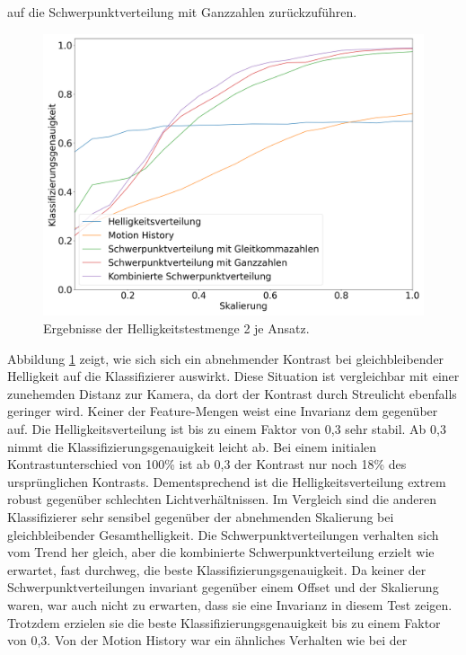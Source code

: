 auf die Schwerpunktverteilung mit Ganzzahlen zurückzuführen.
\begin{figure}[h!]
    \centering
    \includegraphics[width=\linewidth]{images/brightness2_scaling.png}
    \caption{Ergebnisse der Helligkeitstestmenge 2 je Ansatz.}
    \label{fig:brightness2_scaling}
\end{figure}
\newline
\newline
Abbildung \ref{fig:brightness2_scaling} zeigt, wie sich sich ein abnehmender Kontrast bei gleichbleibender Helligkeit auf die Klassifizierer auswirkt. Diese Situation ist vergleichbar mit einer zunehemden Distanz
zur Kamera, da dort der Kontrast durch Streulicht ebenfalls geringer wird. Keiner der Feature-Mengen weist eine Invarianz dem gegenüber auf. Die Helligkeitsverteilung ist bis zu einem Faktor von 0,3 sehr stabil. Ab 0,3
nimmt die Klassifizierungsgenauigkeit leicht ab. Bei einem initialen Kontrastunterschied von 100\% ist ab 0,3 der Kontrast nur noch 18\% des ursprünglichen Kontrasts. Dementsprechend ist die Helligkeitsverteilung extrem
robust gegenüber schlechten Lichtverhältnissen. Im Vergleich sind die anderen Klassifizierer sehr sensibel gegenüber der abnehmenden Skalierung bei gleichbleibender Gesamthelligkeit.
\newpage
Die Schwerpunktverteilungen verhalten sich vom Trend her gleich, aber die
kombinierte Schwerpunktverteilung erzielt wie erwartet, fast durchweg, die beste Klassifizierungsgenauigkeit. Da keiner der Schwerpunktverteilungen invariant gegenüber einem Offset und der Skalierung waren, war auch
nicht zu erwarten, dass sie eine Invarianz in diesem Test zeigen. Trotzdem erzielen sie die beste Klassifizierungsgenauigkeit bis zu einem Faktor von 0,3. Von der Motion History war ein ähnliches Verhalten wie bei der
